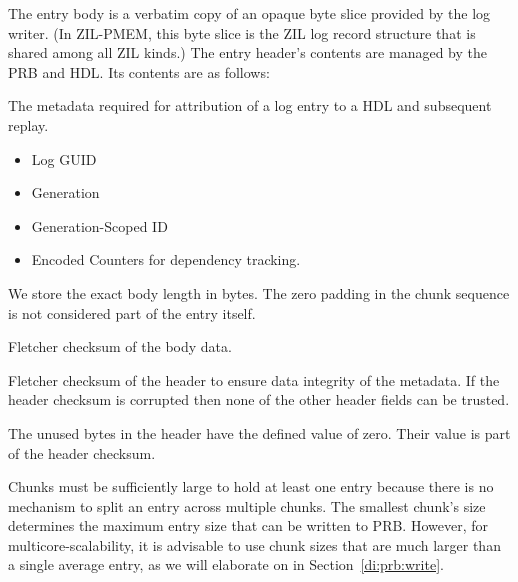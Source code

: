 \documentclass[12pt,a4paper,twoside]{book}
\begin{document}
The entry body is a verbatim copy of an opaque byte slice provided by the log writer.
(In ZIL-PMEM, this byte slice is the ZIL log record structure that is shared among all ZIL kinds.)
The entry header's contents are managed by the PRB and HDL.
Its contents are as follows:
\begin{description}[noitemsep,leftmargin=1.5cm,labelindent=1cm]
    \item[HDL-scoped metadata] The metadata required for attribution of a log entry to a HDL and subsequent replay.
    \begin{itemize}
        \item Log GUID
        \item Generation
        \item Generation-Scoped ID
        \item Encoded Counters for dependency tracking.
    \end{itemize}
    \item[Body Length] We store the exact body length in bytes.
    The zero padding in the chunk sequence is not considered part of the entry itself.
    \item[Body Checksum] Fletcher checksum of the body data.
    \item[Header Checksum] Fletcher checksum of the header to ensure data integrity of the metadata.
    If the header checksum is corrupted then none of the other header fields can be trusted.
    \item[Zero Padding] The unused bytes in the header have the defined value of zero.
    Their value is part of the header checksum.
\end{description}

Chunks must be sufficiently large to hold at least one entry because there is no mechanism to split an entry across multiple chunks.
The smallest chunk's size determines the maximum entry size that can be written to PRB.
However, for multicore-scalability, it is advisable to use chunk sizes that are much larger than a single average entry, as we will elaborate on in Section~\ref{di:prb:write}.
\end{document}
